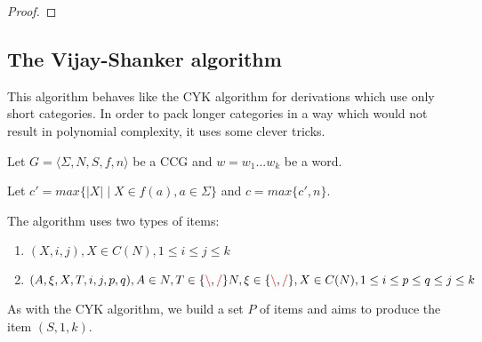 \documentclass[12pt]{extarticle}
\theoremstyle{definition} \newtheorem{defn}{Definition}
\theoremstyle{definition} \newtheorem{prop}{Proposition}
\newcommand{\lc}{\textcolor{red}{\backslash}}
\newcommand{\rc}{\textcolor{red}{/}}
\begin{document}
\begin{proof}
\end{proof}

\subsection{The Vijay-Shanker algorithm}

This algorithm behaves like the CYK algorithm for derivations which use only
short categories. In order to pack longer categories in a way which would not
result in polynomial complexity, it uses some clever tricks.

Let $ G = \langle \Sigma, N, S, f, n \rangle $ be a CCG and $w = w_1 ... w_k$
be a word.

Let $c' = max \{ |X| \mid X \in f(a), a \in \Sigma \}$ and $c = max \{ c', n \}$.

The algorithm uses two types of items:
\begin{enumerate}
    \item $(X, i, j), X \in C(N), 1 \leq i \leq j \leq k$
    \item $(A, \xi, X, T, i, j, p, q), A \in N, T \in \{ \lc, \rc \} N, \xi \in \{ \lc, \rc \}, X \in C(N), 1 \leq i \leq p \leq q \leq j \leq k$
\end{enumerate}

As with the CYK algorithm, we build a set ${P}$ of items and aims to produce the item
$(S, 1, k)$.
\end{document}
